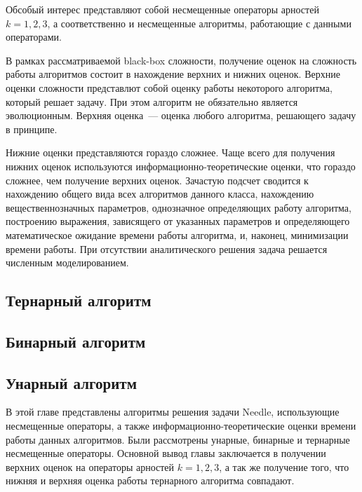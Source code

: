 Обсобый интерес представляют собой несмещенные операторы арностей $k = 1, 2, 3$, а соответственно и несмещенные алгоритмы, работающие с данными операторами.

В рамках рассматриваемой black-box сложности, получение оценок на сложность работы алгоритмов состоит в нахождение верхних и нижних оценок. 
Верхние оценки сложности представлют собой оценку работы некоторого алгоритма, который решает задачу. При этом алгоритм не обязательно является эволюционным. 
Верхняя оценка~--- оценка любого алгоритма, решающего задачу в принципе. 

Нижние оценки представляются гораздо сложнее. Чаще всего для получения нижних оценок используются информационно-теоретические оценки, что гораздо сложнее, чем получение верхних оценок. 
Зачастую подсчет сводится к нахождению общего вида всех алгоритмов данного класса, нахождению вещественнозначных параметров, однозначное определяющих работу алгоритма, построению выражения, 
зависящего от указанных параметров и определяющего математическое ожидание времени работы алгоритма, и, наконец, минимизации времени работы. При отсутствии аналитического решения задача 
решается численным моделированием.   

\subsection{Тернарный алгоритм}


\subsection{Бинарный алгоритм}


\subsection{Унарный алгоритм}


\chapterconclusion

В этой главе представлены алгоритмы решения задачи Needle, использующие несмещенные операторы, а также информационно-теоретические оценки времени работы данных алгоритмов. Были рассмотрены 
унарные, бинарные и тернарные несмещенные операторы. Основной вывод главы заключается в получении верхних оценок на операторы арностей $k = 1, 2, 3$, а так же получение того, что нижняя и верхняя оценка 
работы тернарного алгоритма совпадают.
